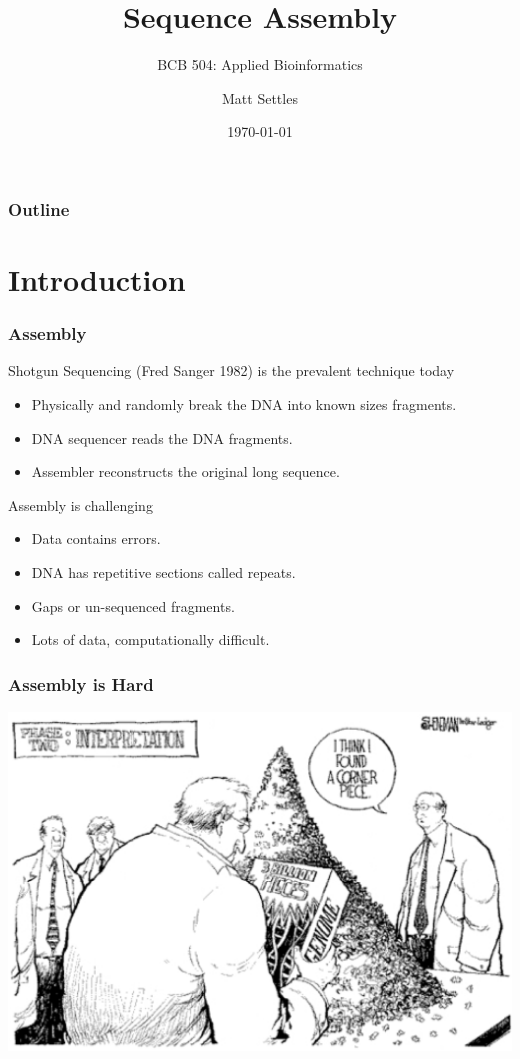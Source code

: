 \documentclass[pdf]{beamer}
\begin{document}
\title[Sequence Assembly]{Sequence Assembly}
\subtitle{BCB 504: Applied Bioinformatics\\}
\author[Matt Settles]{Matt Settles}
\date{\today}


\begin{frame}[plain]
  \titlepage
\end{frame}


\begin{frame}[plain] 
  \frametitle{Outline}
  \tableofcontents
\end{frame}

\section{Introduction}
\begin{frame}
  \frametitle{Assembly}
Shotgun Sequencing (Fred Sanger 1982) is the prevalent technique today
\begin{itemize}
\item Physically and randomly break the DNA into known sizes fragments.
\item DNA sequencer reads the DNA fragments.
\item Assembler reconstructs the original long sequence.
\end{itemize}
Assembly is challenging
\begin{itemize}
\item Data contains errors.
\item DNA has repetitive sections called repeats.
\item Gaps or un-sequenced fragments.
\item Lots of data, computationally difficult.
\end{itemize}
\end{frame}


\begin{frame}
\frametitle{Assembly is Hard}
\begin{center}
\includegraphics[scale=.40]{Figures/AssemblyisHard.png} 
\end{center}
\end{frame}
\end{document}
